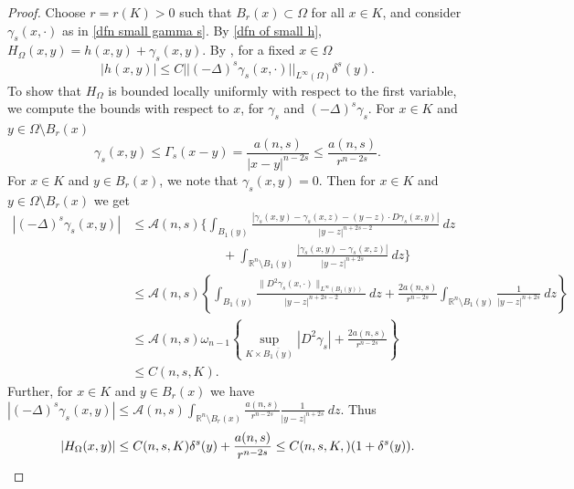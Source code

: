 \documentclass{amsart}
\newcommand{\slap}{(-\Delta)^{s}}
\newcommand{\rn}{\mathbb{R}^{n}}
\begin{document}
\begin{proof}
   Choose $r=r(K)>0$ such that $B_{r}(x)\subset \Omega$ for all $x\in K$, and consider $\gamma_{s}(x,\cdot)$ as in \eqref{dfn small gamma s}. By \eqref{dfn of small h}, $H_{\Omega}(x,y)=h(x,y)+\gamma_{s}(x,y)$. By \cite[Lemma 2.7]{ROSOTON2014275}, for a fixed $x\in \Omega$ 
    \begin{equation*}
        |h(x,y)|\leq C ||\slap \gamma_{s}(x,\cdot)||_{L^{\infty}(\Omega)}\delta^{s}(y).
    \end{equation*}
    To show that $H_{\Omega}$ is bounded locally uniformly with respect to the first variable, we compute the bounds with respect to $x$, for $\gamma_{s}$ and $\slap \gamma_{s}$. For $x\in K$ and $y\in \Omega\setminus B_{r}(x)$
    \begin{equation*}
        \gamma_{s}(x,y)\leq \Gamma_{s}(x-y)=\frac{a(n,s)}{|x-y|^{n-2s}}\leq \frac{a(n,s)}{r^{n-2s}}.
    \end{equation*}
 For $x\in K$ and $y\in B_{r}(x)$, we note that $\gamma_{s}(x,y)=0$. Then for $x\in K$ and $y\in \Omega\setminus B_{r}(x)$ we get
    \begin{equation*}
    \begin{split}
        |\slap \gamma_{s}(x,y)| 
          &\leq \mathcal{A}(n,s) \Big\{\int_{B_{1}(y)}\frac{\left|\gamma_s(x,y)-\gamma_{s}(x,z) - (y-z)\cdot D\gamma_s(x,y)\right|}{|y-z|^{n+2s-2}}\ dz \\
          & \hspace{3cm}+\int_{\rn\setminus B_{1}(y)}\frac{\left|\gamma_s(x,y)-\gamma_{s}(x,z)\right|}{|y-z|^{n+2s}}\ dz\Big\}\\
        &\leq \mathcal{A}(n,s) \left\{\int_{B_{1}(y)}\frac{\|D^{2} \gamma_{s}(x,\cdot)\|_{L^\infty(B_1(y))}}{|y-z|^{n+2s-2}}\ dz+ \frac{2a(n,s)}{r^{n-2s}}\int_{\rn\setminus B_{1}(y)}\frac{1}{|y-z|^{n+2s}}\ dz\right\}\\
        &\leq \mathcal{A}(n,s)\omega_{n-1}\left\{\sup_{K\times \overline{B_{1}(y)}}\left|D^{2} \gamma_{s}\right| +\frac{2a(n,s)}{r^{n-2s}}\right\}\\
        &\leq C(n,s,K). 
    \end{split}
    \end{equation*}
    Further, for $x\in K$ and $y\in B_{r}(x)$ we have $ \displaystyle |\slap \gamma_{s}(x,y)|\leq \mathcal{A}(n,s)\int_{\rn\setminus B_{r}(x)} \frac{a(n,s)}{r^{n-2s}}\frac{1}{|y-z|^{n+2s}}\ dz.$
    Thus 
    \begin{equation*}\label{eqn local uniform bound for H}
        |H_{\Omega}(x,y)|\leq C(n,s,K) \delta^{s}(y)+\frac{a(n,s)}{r^{n-2s}}\leq C(n,s,K,)(1+\delta^{s}(y)).\qedhere
    \end{equation*} 
\end{proof}
\end{document}
